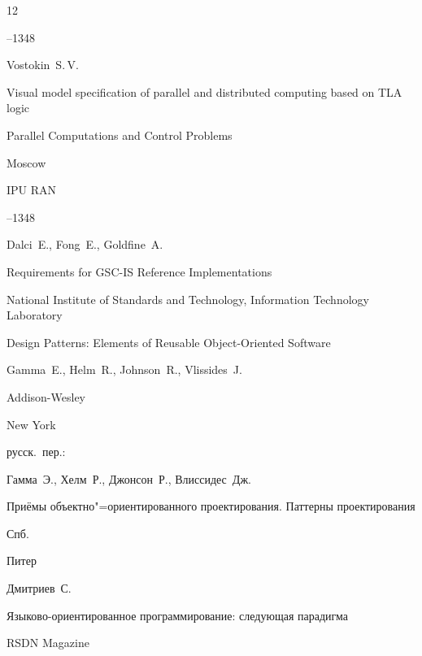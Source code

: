 \begin{thebibliography}{12}

--1348

\misctransl 

\by Vostokin~S.\,V.

\paper Visual model specification of parallel and distributed computing based on TLA logic 

\inbook Parallel Computations and Control Problems

\publaddr Moscow

\publ IPU RAN 


--1348






\by Dalci~E., Fong~E., Goldfine~A. 

\preprint Requirements for GSC-IS Reference Implementations

\publaddr National Institute of Standards and Technology, Information Technology Laboratory





\book Design Patterns: Elements of Reusable Object-Oriented Software

\by Gamma~E., Helm~R., Johnson~R., Vlissides~J.


\publ Addison-Wesley

\publaddr New York


\rtransl русск.~пер.: {} 

\by Гамма~Э., Хелм~Р., Джонсон~Р., Влиссидес~Дж. 

\book Приёмы объектно"=ориентированного проектирования. Паттерны проектирования

\publaddr Спб.

\publ Питер






\by Дмитриев~С.

\paper Языково-ориентированное программирование: следующая парадигма 

\jour RSDN Magazine




\end{thebibliography}
